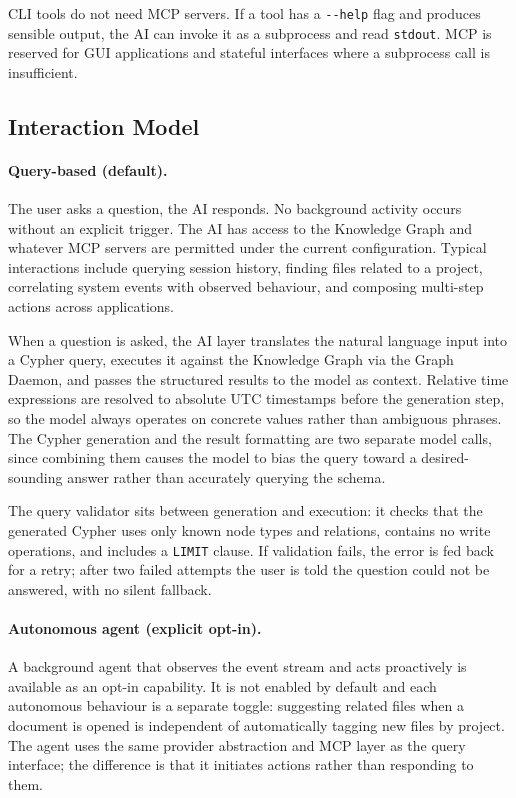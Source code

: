 CLI tools do not need MCP servers. If a tool has a \texttt{-{}-help} flag and
produces sensible output, the AI can invoke it as a subprocess and read
\texttt{stdout}. MCP is reserved for GUI applications and stateful interfaces
where a subprocess call is insufficient.

\subsection{Interaction Model}
\label{sec:ai-interaction}

\paragraph{Query-based (default).}
The user asks a question, the AI responds. No background activity occurs
without an explicit trigger. The AI has access to the Knowledge Graph and
whatever MCP servers are permitted under the current configuration. Typical
interactions include querying session history, finding files related to a
project, correlating system events with observed behaviour, and composing
multi-step actions across applications.

When a question is asked, the AI layer translates the natural language input
into a Cypher query, executes it against the Knowledge Graph via the Graph
Daemon, and passes the structured results to the model as context. Relative
time expressions are resolved to absolute UTC timestamps before the generation
step, so the model always operates on concrete values rather than ambiguous
phrases. The Cypher generation and the result formatting are two separate model
calls, since combining them causes the model to bias the query toward a
desired-sounding answer rather than accurately querying the schema.

The query validator sits between generation and execution: it checks that the
generated Cypher uses only known node types and relations, contains no write
operations, and includes a \texttt{LIMIT} clause. If validation fails, the
error is fed back for a retry; after two failed attempts the user is told the
question could not be answered, with no silent fallback.

\paragraph{Autonomous agent (explicit opt-in).}
A background agent that observes the event stream and acts proactively is
available as an opt-in capability. It is not enabled by default and each
autonomous behaviour is a separate toggle: suggesting related files when a
document is opened is independent of automatically tagging new files by
project. The agent uses the same provider abstraction and MCP layer as the
query interface; the difference is that it initiates actions rather than
responding to them.

